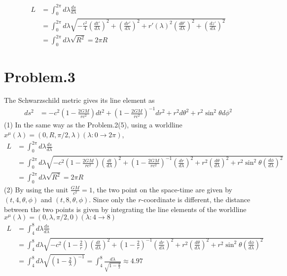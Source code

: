 \documentclass[12pt]{article}
\begin{document}
\begin{align*}
L &= \int^{2 \pi}_{0} d\lambda \frac{d s}{d \lambda}\\[1em]
&= \int^{2 \pi}_{0} d\lambda \sqrt{-\frac{c^2}{4} \left(\frac{dt'}{d \lambda}\right)^2 +\left(\frac{dr'}{d \lambda}\right)^2 + r'(\lambda)^2 \left(\frac{d\theta'}{d \lambda}\right)^2 + \left(\frac{dz'}{d \lambda}\right)^2}\\[1em]
&= \int^{2 \pi}_{0} d\lambda \sqrt{R^2} = 2 \pi R
\end{align*}
\section*{Problem.3}
The Schwarzschild metric gives its line element as
\begin{align*}
ds^2 &= -c^2 \left(1 - \frac{2 G M}{r c^2} \right) dt^2 + \left(1 - \frac{2 G M}{r c^2} \right)^{-1} dr^2 + r^2 d\theta^2 + r^2 \sin^2{\theta} d\phi^2
\end{align*}
(1)
In the same way as the Problem.2(5), using a worldline $x^{\mu}(\lambda) = \left(0, R, \pi/2, \lambda\right) \left(\lambda: 0 \rightarrow 2\pi\right)$,
\begin{align*}
L &= \int^{2 \pi}_{0} d\lambda \frac{d s}{d \lambda}\\[1em]
&= \int^{2 \pi}_{0} d\lambda \sqrt{- c^2 \left(1 - \frac{2 G M}{r c^2} \right) \left(\frac{dt}{d \lambda}\right)^2 + \left(1 - \frac{2 G M}{r c^2} \right)^{-1} \left(\frac{dr}{d \lambda}\right)^2 + r^2 \left(\frac{d\theta}{d \lambda}\right)^2 + r^2 \sin^2{\theta} \left(\frac{d \phi}{d \lambda}\right)^2}\\[1em]
&= \int^{2 \pi}_{0} d\lambda \sqrt{R^2} = 2 \pi R
\end{align*}
(2)
By using the unit $\frac{G M}{c^2} = 1$, the two point on the space-time are given by $\left(t, 4, \theta, \phi \right)$ and $\left(t, 8, \theta, \phi \right)$. Since only the $r$-coordinate is different, the distance between the two points is given by integrating the line elements of the worldline $x^{\mu}(\lambda) = \left(0, \lambda, \pi/2, 0\right) \left(\lambda: 4 \rightarrow 8\right)$
\begin{align*}
L &= \int^{8}_{4} d\lambda \frac{d s}{d \lambda}\\[1em]
&= \int^{8}_{4} d\lambda \sqrt{- c^2 \left(1 - \frac{2}{r} \right) \left(\frac{dt}{d \lambda}\right)^2 + \left(1 - \frac{2}{r} \right)^{-1} \left(\frac{dr}{d \lambda}\right)^2 + r^2 \left(\frac{d\theta}{d \lambda}\right)^2 + r^2 \sin^2{\theta} \left(\frac{d \phi}{d \lambda}\right)^2}\\[1em]
&= \int^{8}_{4} d\lambda \sqrt{\left(1 - \frac{2}{\lambda} \right)^{-1}} = \int^{8}_{4} \frac{d\lambda}{\sqrt{1 - \frac{2}{\lambda}}} \approx 4.97\\[1em]
\end{align*}
\end{document}
